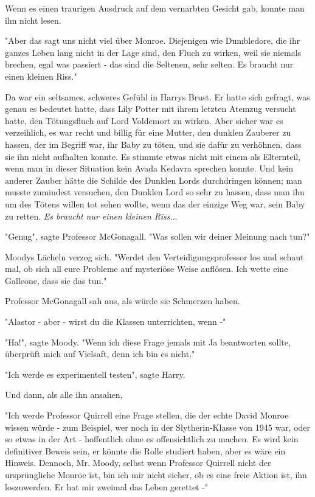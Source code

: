 {Wenn es einen traurigen Ausdruck auf dem vernarbten Gesicht gab, konnte man ihn nicht lesen.

"Aber das sagt uns nicht viel über Monroe. Diejenigen wie Dumbledore, die ihr ganzes Leben lang nicht in der Lage sind, den Fluch zu wirken, weil sie niemals brechen, egal was passiert - das sind die Seltenen, sehr selten. Es braucht nur einen kleinen Riss."

Da war ein seltsames, schweres Gefühl in Harrys Brust. Er hatte sich gefragt, was genau es bedeutet hatte, dass Lily Potter mit ihrem letzten Atemzug versucht hatte, den Tötungsfluch auf Lord Voldemort zu wirken. Aber sicher war es verzeihlich, es war recht und billig für eine Mutter, den dunklen Zauberer zu hassen, der im Begriff war, ihr Baby zu töten, und sie dafür zu verhöhnen, dass sie ihn nicht aufhalten konnte. Es stimmte etwas nicht mit einem als Elternteil, wenn man in dieser Situation kein Avada Kedavra sprechen konnte. Und kein anderer Zauber hätte die Schilde des Dunklen Lords durchdringen können; man musste zumindest versuchen, den Dunklen Lord so sehr zu hassen, dass man ihn um des Tötens willen tot sehen wollte, wenn das der einzige Weg war, sein Baby zu retten. \emph{Es braucht nur einen kleinen Riss.}..

"Genug", sagte Professor McGonagall. "Was sollen wir deiner Meinung nach tun?"

Moodys Lächeln verzog sich. "Werdet den Verteidigungsprofessor los und schaut mal, ob sich all eure Probleme auf mysteriöse Weise auflösen. Ich wette eine Galleone, dass sie das tun."

Professor McGonagall sah aus, als würde sie Schmerzen haben.

"Alastor - aber - wirst du die Klassen unterrichten, wenn -"

"Ha!", sagte Moody. "Wenn ich diese Frage jemals mit Ja beantworten sollte, überprüft mich auf Vielsaft, denn ich bin es nicht."

"Ich werde es experimentell testen", sagte Harry.

Und dann, als alle ihn ansahen,

"Ich werde Professor Quirrell eine Frage stellen, die der echte David Monroe wissen würde - zum Beispiel, wer noch in der Slytherin-Klasse von 1945 war, oder so etwas in der Art - hoffentlich ohne es offensichtlich zu machen. Es wird kein definitiver Beweis sein, er könnte die Rolle studiert haben, aber es wäre ein Hinweis. Dennoch, Mr. Moody, selbst wenn Professor Quirrell nicht der ursprüngliche Monroe ist, bin ich mir nicht sicher, ob es eine freie Aktion ist, ihn loszuwerden. Er hat mir zweimal das Leben gerettet -"

}
